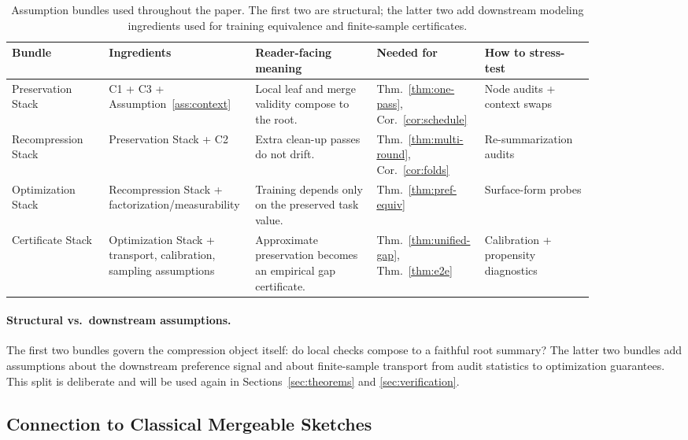 \begin{table}[t]
\centering\footnotesize
\setlength{\tabcolsep}{3pt}
\begin{tabular}{p{0.16\linewidth}p{0.18\linewidth}p{0.20\linewidth}p{0.14\linewidth}p{0.18\linewidth}}
\toprule
Bundle & Ingredients & Reader-facing meaning & Needed for & How to stress-test \\
\midrule
Preservation Stack & C1 + C3 + Assumption~\ref{ass:context} & Local leaf and merge validity compose to the root. & Thm.~\ref{thm:one-pass}, Cor.~\ref{cor:schedule} & Node audits + context swaps \\
Recompression Stack & Preservation Stack + C2 & Extra clean-up passes do not drift. & Thm.~\ref{thm:multi-round}, Cor.~\ref{cor:folds} & Re-summarization audits \\
Optimization Stack & Recompression Stack + factorization/measurability & Training depends only on the preserved task value. & Thm.~\ref{thm:pref-equiv} & Surface-form probes \\
Certificate Stack & Optimization Stack + transport, calibration, sampling assumptions & Approximate preservation becomes an empirical gap certificate. & Thm.~\ref{thm:unified-gap}, Thm.~\ref{thm:e2e} & Calibration + propensity diagnostics \\
\bottomrule
\end{tabular}
\caption{Assumption bundles used throughout the paper. The first two are structural; the latter two add downstream modeling ingredients used for training equivalence and finite-sample certificates.}
\label{tab:assumption-bundles}
\end{table}

\paragraph{Structural vs.\ downstream assumptions.}
The first two bundles govern the compression object itself: do local checks compose to a faithful root summary? The latter two bundles add assumptions about the downstream preference signal and about finite-sample transport from audit statistics to optimization guarantees. This split is deliberate and will be used again in Sections~\ref{sec:theorems} and \ref{sec:verification}.

\subsection{Connection to Classical Mergeable Sketches}


